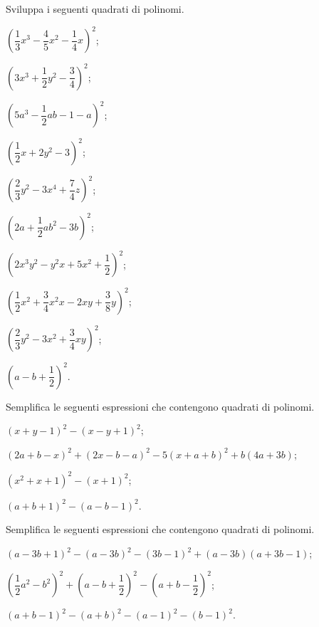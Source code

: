 \begin{esercizio}
 \label{ese:12.13}
Sviluppa i seguenti quadrati di polinomi.
\begin{multicols}{2}
\begin{enumeratea}
\spazielenx
\item $\left(\dfrac{1}{3}x^{3}-\dfrac{4}{5}x^{2}-\dfrac{1}{4}x\right)^{2}$;
\item $\left(3x^{3}+\dfrac{1}{2}y^{2}-\dfrac{3}{4}\right)^{2}$;
\item $\left(5a^{3}-\dfrac{1}{2}{ab}-1-a\right)^{2}$;
\item $\left(\dfrac{1}{2}x+2y^{2}-3\right)^{2}$;
\item $\left(\dfrac{2}{3}y^{2}-3x^{4}+\dfrac{7}{4}z\right)^{2}$;
\item $\left(2a+\dfrac{1}{2}{ab}^{2}-3b\right)^{2}$;
\item $\left(2x^{3}y^{2}-y^{2}x+5x^{2}+\dfrac{1}{2}\right)^{2}$;
\item $\left(\dfrac{1}{2}x^{2}+\dfrac{3}{4}x^{2}x-2{xy}+\dfrac{3}{8}y\right)^{2}$;
\item $\left(\dfrac{2}{3}y^{2}-3x^{2}+\dfrac{3}{4}{xy}\right)^{2}$;
\item $\left(a-b+\dfrac{1}{2}\right)^{2}$.
\end{enumeratea}
\end{multicols}
\end{esercizio}

\begin{esercizio}[\Ast]
 \label{ese:12.14}
Semplifica le seguenti espressioni che contengono quadrati di polinomi.
\begin{enumeratea}
 \item $(x+y-1)^{2}-(x-y+1)^{2}$;
\item $(2a+b-x)^{2}+(2x-b-a)^{2}-5(x+a+b)^{2}+b(4a+3b)$;
\item $\left(x^{2}+x+1\right)^{2}-(x+1)^{2}$;
\item $(a+b+1)^{2}-(a-b-1)^{2}$.
\end{enumeratea}
\end{esercizio}

\begin{esercizio}
 \label{ese:12.15}
Semplifica le seguenti espressioni che contengono quadrati di polinomi.
\begin{enumeratea}
 \item $(a-3b+1)^{2}-(a-3b)^{2}-(3b-1)^{2}+(a-3b)(a+3b-1)$;
\item $\left(\dfrac{1}{2}a^{2}-b^{2}\right)^{2}+\left(a-b+\dfrac{1}{2}\right)^{2}-\left(a+b-\dfrac{1}{2}\right)^{2}$;
\item $(a+b-1)^{2}-(a+b)^{2}-(a-1)^{2}-(b-1)^{2}$.
\end{enumeratea}
\end{esercizio}

